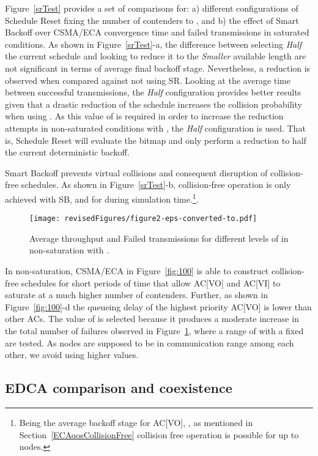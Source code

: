 \documentclass[a4paper]{article}
\begin{document}
Figure~\ref{srTest} provides a set of comparisons for: a) different configurations of Schedule Reset fixing the number of contenders to , and b) the effect of Smart Backoff over CSMA/ECA convergence time and failed transmissions in saturated conditions. As shown in Figure~\ref{srTest}-a, the difference between selecting \emph{Half} the current schedule and looking to reduce it to the \emph{Smaller} available length are not significant in terms of average final backoff stage. Nevertheless, a reduction is observed when compared against not using SR. Looking at the average time between successful transmissions, the \emph{Half} configuration provides better results given that a drastic reduction of the schedule increases the collision probability when using . As this value of  is required in order to increase the reduction attempts in non-saturated conditions with , the \emph{Half} configuration is used. That is, Schedule Reset will evaluate the bitmap and only perform a reduction to half the current deterministic backoff.

Smart Backoff prevents virtual collisions and consequent disruption of collision-free schedules. As shown in Figure~\ref{srTest}-b, collision-free operation is only achieved with SB, and for  during simulation time.\footnote{Being the average backoff stage for AC[VO], , as mentioned in Section~\ref{ECAqosCollisionFree} collision free operation is possible for up to  nodes.}.

	\begin{figure}[t]
	\centering
		\texttt{[image: revisedFigures/figure2-eps-converted-to.pdf]}
		\caption{Average throughput and Failed transmissions for different levels of  in non-saturation with .}
		\label{fig:evError}
	\end{figure}

In non-saturation, CSMA/ECA in Figure~\ref{fig:100} is able to construct collision-free schedules for short periods of time that allow AC[VO] and AC[VI] to saturate at a much higher number of contenders. Further, as shown in Figure~\ref{fig:100}-d the queueing delay of the highest priority AC[VO] is lower than other ACs. The value of  is selected because it produces a moderate increase in the total number of failures observed in Figure~\ref{fig:evError}, where a range of  with a fixed  are tested. As nodes are supposed to be in communication range among each other, we avoid using higher  values.

\subsection{EDCA comparison and coexistence}
\end{document}
